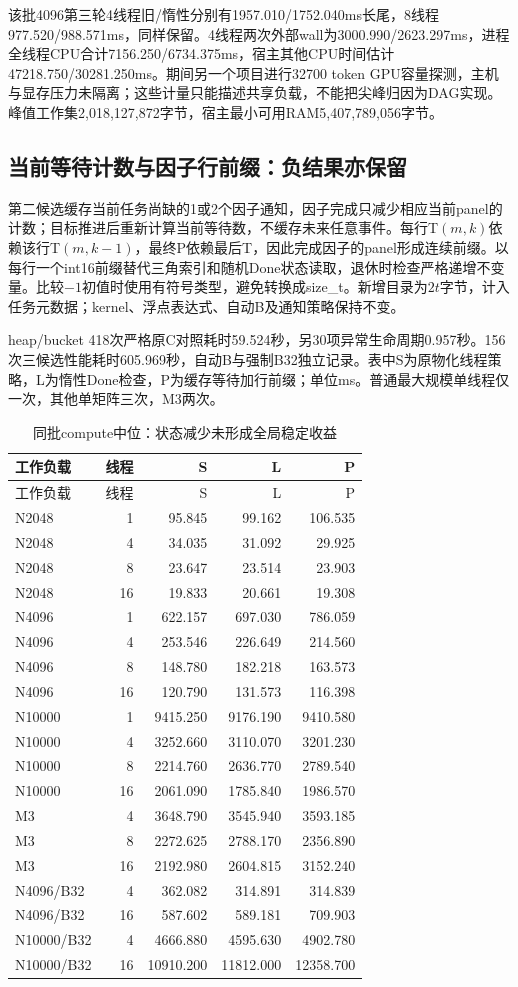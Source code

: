 \documentclass[UTF8,a4paper,11pt]{ctexart}
\begin{document}
该批4096第三轮4线程旧/惰性分别有1957.010/\allowbreak{}1752.040ms长尾，8线程977.520/\allowbreak{}988.571ms，同样保留。4线程两次外部wall为3000.990/\allowbreak{}2623.297ms，进程全线程CPU合计7156.250/\allowbreak{}6734.375ms，宿主其他CPU时间估计47218.750/\allowbreak{}30281.250ms。期间另一个项目进行32700 token GPU容量探测，主机与显存压力未隔离；这些计量只能描述共享负载，不能把尖峰归因为DAG实现。峰值工作集2,018,127,872字节，宿主最小可用RAM5,407,789,056字节。

\subsection{当前等待计数与因子行前缀：负结果亦保留}
第二候选缓存当前任务尚缺的1或2个因子通知，因子完成只减少相应当前panel的计数；目标推进后重新计算当前等待数，不缓存未来任意事件。每行T$(m,k)$依赖该行T$(m,k-1)$，最终P依赖最后T，因此完成因子的panel形成连续前缀。以每行一个int16前缀替代三角索引和随机Done状态读取，退休时检查严格递增不变量。比较$-1$初值时使用有符号类型，避免转换成size\_t。新增目录为$2t$字节，计入任务元数据；kernel、浮点表达式、自动B及通知策略保持不变。

heap/bucket 418次严格原C对照耗时59.524秒，另30项异常生命周期0.957秒。156次三候选性能耗时605.969秒，自动B与强制B32独立记录。表中S为原物化线程策略，L为惰性Done检查，P为缓存等待加行前缀；单位ms。普通最大规模单线程仅一次，其他单矩阵三次，M3两次。
\begingroup\small\setlength{\tabcolsep}{4pt}
\begin{longtable}{@{}lrrrr@{}}
\caption{同批compute中位：状态减少未形成全局稳定收益}\\\toprule
工作负载&线程&S&L&P\\\midrule\endfirsthead
\toprule 工作负载&线程&S&L&P\\\midrule\endhead
N2048&1&95.845&99.162&106.535\\
N2048&4&34.035&31.092&29.925\\
N2048&8&23.647&23.514&23.903\\
N2048&16&19.833&20.661&19.308\\
N4096&1&622.157&697.030&786.059\\
N4096&4&253.546&226.649&214.560\\
N4096&8&148.780&182.218&163.573\\
N4096&16&120.790&131.573&116.398\\
N10000&1&9415.250&9176.190&9410.580\\
N10000&4&3252.660&3110.070&3201.230\\
N10000&8&2214.760&2636.770&2789.540\\
N10000&16&2061.090&1785.840&1986.570\\
M3&4&3648.790&3545.940&3593.185\\
M3&8&2272.625&2788.170&2356.890\\
M3&16&2192.980&2604.815&3152.240\\
N4096/B32&4&362.082&314.891&314.839\\
N4096/B32&16&587.602&589.181&709.903\\
N10000/B32&4&4666.880&4595.630&4902.780\\
N10000/B32&16&10910.200&11812.000&12358.700\\
\bottomrule\end{longtable}\endgroup
\end{document}
